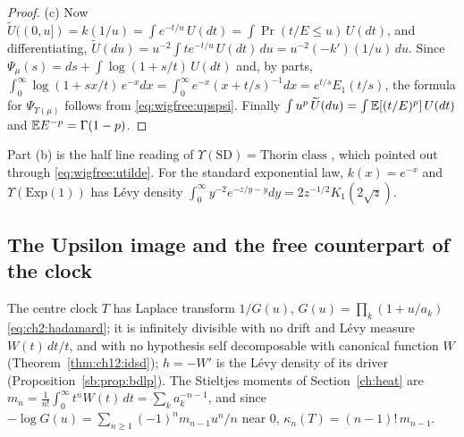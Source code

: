 \begin{proof}
(c) Now $\widetilde U((0,u])=k(1/u)=\int e^{-t/u}\,U(dt)=\int\Pr(t/E\le u)\,U(dt)$, and differentiating, $\widetilde U(du)=u^{-2}\int te^{-t/u}\,U(dt)\,du=u^{-2}(-k')(1/u)\,du$. Since $\Psi_\mu(s)=ds+\int\log(1+s/t)\,U(dt)$ and, by parts, $\int_0^\infty\log(1+sx/t)\,e^{-x}dx=\int_0^\infty e^{-x}(x+t/s)^{-1}dx=e^{t/s}E_1(t/s)$, the formula for $\Psi_{\Upsilon(\mu)}$ follows from \eqref{eq:wigfree:upspsi}. Finally $\int u^p\,\widetilde U(du)=\int\mathbb{E}[(t/E)^p]\,U(dt)$ and $\mathbb{E} E^{-p}=\Gamma(1-p)$.
\end{proof}

Part (b) is the half line reading of $\Upsilon(\text{SD})=\text{Thorin class}$ \cite{BNMS06}, which \cite{P26wig} pointed out through \eqref{eq:wigfree:utilde}. For the standard exponential law, $k(x)=e^{-x}$ and $\Upsilon(\text{Exp}(1))$ has L\'evy density $\int_0^\infty y^{-2}e^{-z/y-y}dy=2z^{-1/2}K_1(2\sqrt z)$.

\subsection{The Upsilon image and the free counterpart of the clock}\label{sec:wigfree:clock}

The centre clock $T$ has Laplace transform $1/G(u)$, $G(u)=\prod_k(1+u/a_k)$ \eqref{eq:ch2:hadamard}; it is infinitely divisible with no drift and L\'evy measure $W(t)\,dt/t$, and with no hypothesis self decomposable with canonical function $W$ (Theorem~\ref{thm:ch12:idsd}); $h=-W'$ is the L\'evy density of its driver (Proposition~\ref{sb:prop:bdlp}). The Stieltjes moments of Section~\ref{ch:heat} are $m_n=\frac1{n!}\int_0^\infty t^nW(t)\,dt=\sum_ka_k^{-n-1}$, and since $-\log G(u)=\sum_{n\ge1}(-1)^nm_{n-1}u^n/n$ near $0$, $\kappa_n(T)=(n-1)!\,m_{n-1}$.

